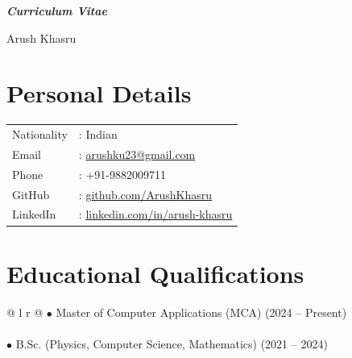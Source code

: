 \documentclass[11pt,a4paper]{article}
\begin{document}
\begin{center}
{\Large\bfseries \textit{Curriculum Vitae}}
\end{center}

\vspace{0.5cm}

\noindent
{\Large Arush Khasru}

\section*{Personal Details}

\noindent
\begin{tabular}{@{} l l @{}}
Nationality & : Indian \\
Email       & : \href{mailto:arushku23@gmail.com}{arushku23@gmail.com} \\
Phone       & : +91-9882009711 \\
GitHub      & : \href{https://github.com/ArushKhasru}{github.com/ArushKhasru} \\
LinkedIn    & : \href{https://linkedin.com/in/arush-khasru}{linkedin.com/in/arush-khasru} \\
\end{tabular}

\section*{Educational Qualifications}

\noindent
\begin{tabular}{@{} l r @{}}
$\bullet$ Master of Computer Applications (MCA) \hspace{14em} (2024 -- Present) \\
 \\

$\bullet$ B.Sc. (Physics, Computer Science, Mathematics) \hspace{11.5em}(2021 -- 2024) \\
 \\
 \\
\end{tabular}
\end{document}
